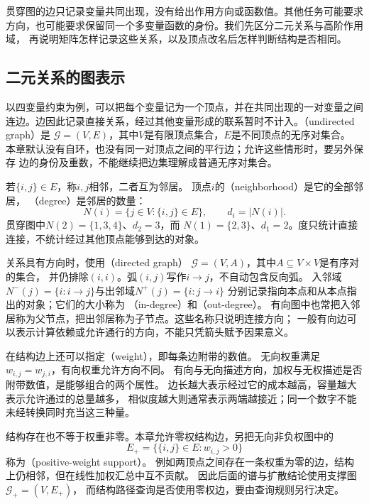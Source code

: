 贯穿图的边只记录变量共同出现，没有给出作用方向或函数值。其他任务可能要求
方向，也可能要求保留同一个多变量函数的身份。我们先区分二元关系与高阶作用域，
再说明矩阵怎样记录这些关系，以及顶点改名后怎样判断结构是否相同。

\subsection{二元关系的图表示}
\label{sec:graph-theory-local-relations}
\label{sec:graph-theory-binary-relations}

以四变量约束为例，可以把每个变量记为一个顶点，并在共同出现的一对变量之间
连边。边因此记录直接关系，经过其他变量形成的联系暂时不计入。（undirected graph）是
\(\mathcal G=(V,E)\)，其中\(V\)是有限顶点集合，\(E\)是不同顶点的无序对集合。
本章默认没有自环，也没有同一对顶点之间的平行边；允许这些情形时，要另外保存
边的身份及重数，不能继续把边集理解成普通无序对集合。

若\(\{i,j\}\in E\)，称\(i,j\)相邻，二者互为邻居。
顶点\(i\)的（neighborhood）是它的全部邻居，
（degree）是邻居的数量：
\[
  N(i)=\{j\in V:\{i,j\}\in E\},\qquad d_i=|N(i)|.
\]
贯穿图中\(N(2)=\{1,3,4\}\)、\(d_2=3\)，而
\(N(1)=\{2,3\}\)、\(d_1=2\)。度只统计直接连接，不统计经过其他顶点能够到达的对象。

关系具有方向时，使用（directed graph）
\(\mathcal G=(V,A)\)，其中\(A\subseteq V\times V\)是有序对的集合，
并仍排除\((i,i)\)。弧\((i,j)\)写作\(i\to j\)，不自动包含反向弧。
入邻域\(N^-(j)=\{i:i\to j\}\)与出邻域\(N^+(j)=\{i:j\to i\}\)
分别记录指向本点和从本点指出的对象；它们的大小称为
（in-degree）和（out-degree）。
有向图中也常把入邻居称为父节点，把出邻居称为子节点。这些名称只说明连接方向；
一般有向边可以表示计算依赖或允许通行的方向，不能只凭箭头赋予因果意义。

在结构边上还可以指定（weight），即每条边附带的数值。
无向权重满足\(w_{i,j}=w_{j,i}\)，有向权重允许方向不同。
有向与无向描述方向，加权与无权描述是否附带数值，是能够组合的两个属性。
边长越大表示经过它的成本越高，容量越大表示允许通过的总量越多，
相似度越大则通常表示两端越接近；同一个数字不能未经转换同时充当这三种量。

结构存在也不等于权重非零。本章允许零权结构边，另把无向非负权图中的
\[
  E_+=\{\{i,j\}\in E:w_{i,j}>0\}
\]
称为（positive-weight support）。
例如两顶点之间存在一条权重为零的边，结构上仍相邻，但在线性加权汇总中互不贡献。
因此后面的谱与扩散结论使用支撑图\(\mathcal G_+=(V,E_+)\)，
而结构路径查询是否使用零权边，要由查询规则另行决定。

